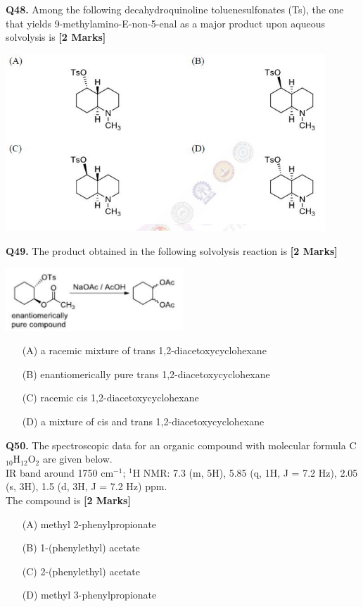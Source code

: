 \documentclass[11pt]{article}
\newcommand{\questionb}[2]{
    \noindent\textbf{Q#2.} #1 \hfill \textbf{[2 Marks]}
}
\begin{document}
\questionb{Among the following decahydroquinoline toluenesulfonates (Ts), the one that yields 9-methylamino-E-non-5-enal as a major product upon aqueous solvolysis is}{48}
\begin{center}
\includegraphics[width=0.9\textwidth]{figures/48.png}
\end{center}
\vspace{0.5cm}

\questionb{The product obtained in the following solvolysis reaction is}{49}
\begin{center}
\includegraphics[width=0.5\textwidth]{figures/49.png}
\end{center}
\begin{enumerate}
    \item[(A)] a racemic mixture of trans 1,2-diacetoxycyclohexane
    \item[(B)] enantiomerically pure trans 1,2-diacetoxycyclohexane
    \item[(C)] racemic cis 1,2-diacetoxycyclohexane
    \item[(D)] a mixture of cis and trans 1,2-diacetoxycyclohexane
\end{enumerate}
\vspace{0.5cm}

\questionb{The spectroscopic data for an organic compound with molecular formula C\(_{10}\)H\(_{12}\)O\(_2\) are given below. \\
IR band around 1750 cm\(^{-1}\); \( ^1 \)H NMR: 7.3 (m, 5H), 5.85 (q, 1H, J = 7.2 Hz), 2.05 (s, 3H), 1.5 (d, 3H, J = 7.2 Hz) ppm. \\
The compound is}{50}
\begin{enumerate}
    \item[(A)] methyl 2-phenylpropionate
    \item[(B)] 1-(phenylethyl) acetate
    \item[(C)] 2-(phenylethyl) acetate
    \item[(D)] methyl 3-phenylpropionate
\end{enumerate}
\vspace{0.5cm}
\end{document}
